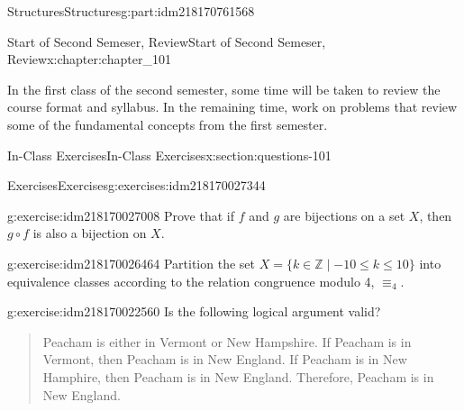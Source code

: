 \documentclass[oneside,10pt,]{book}
\numberwithin{equation}{section}
\begin{document}
\begin{partptx}{Structures}{}{Structures}{}{}{g:part:idm218170761568}
%
\typeout{************************************************}
\typeout{************************************************}
%
\begin{chapterptx}{Start of Second Semeser, Review}{}{Start of Second Semeser, Review}{}{}{x:chapter:chapter_101}
\begin{introduction}{}%
In the first class of the second semester, some time will be taken to review the course format and syllabus.  In the remaining time, work on problems that review some of the fundamental concepts from the first semester.%
\end{introduction}%
%
%
\typeout{************************************************}
\typeout{************************************************}
%
\begin{sectionptx}{In-Class Exercises}{}{In-Class Exercises}{}{}{x:section:questions-101}
%
%
%
\typeout{************************************************}
\typeout{************************************************}
%
\begin{exercises-subsection-numberless}{Exercises}{}{Exercises}{}{}{g:exercises:idm218170027344}
\par\medskip\noindent%
%
\begin{exercisegroup}
\begin{divisionexerciseeg}{1}{}{}{g:exercise:idm218170027008}%
Prove that if \(f\) and \(g\) are bijections on a set \(X\), then \(g \circ f\) is also a bijection on \(X\).%
\end{divisionexerciseeg}%
\begin{divisionexerciseeg}{2}{}{}{g:exercise:idm218170026464}%
Partition the set \(X=\{k \in \mathbb{Z} \mid  -10 \leq k \leq 10\}\) into equivalence classes according to the relation congruence modulo 4, \(\equiv_4\).%
\end{divisionexerciseeg}%
\begin{divisionexerciseeg}{3}{}{}{g:exercise:idm218170022560}%
Is the following logical argument valid?%
\begin{quote}%
Peacham is either in Vermont or New Hampshire. If Peacham is in Vermont, then Peacham is in New England. If Peacham is in New Hamphire, then Peacham is in New England. Therefore, Peacham is in New England.%
\end{quote}
\par\smallskip%

\end{divisionexerciseeg}
\end{exercisegroup}
\end{exercises-subsection-numberless}
\end{sectionptx}
\end{chapterptx}
\end{partptx}
\end{document}
